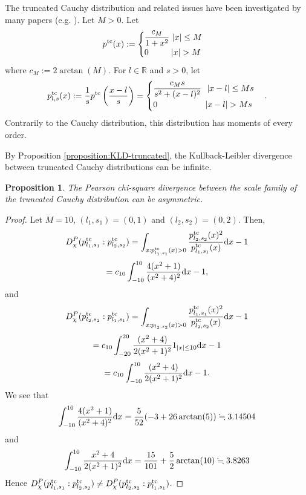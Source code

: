\documentclass[journal]{IEEEtran}
\newtheorem{proposition}[theorem]{Proposition}
\begin{document}
The truncated Cauchy distribution and related issues have been investigated by many papers (e.g. \cite{Nadarajah2004, Nadarajah2007,  Ateya2013, Aldahlan2020}). 
Let $M > 0$. 
Let 
\[ p^{\textup{tc}}(x) := \begin{cases} \dfrac{c_M}{1+x^2} \ |x| \le M \\ 0 \ \ \ \   \ \  \ \ |x| > M \end{cases} \]
where $c_M := 2 \arctan(M)$. 
For $l \in \mathbb{R}$ and $s > 0$, 
let 
\[ p^{\textup{tc}}_{l,s}(x) := \frac{1}{s} p^{\textup{tc}}\left(\frac{x-l}{s}\right) =  \begin{cases} \dfrac{c_M s}{s^2+(x-l)^2} \ \  |x-l| \le Ms \\ 0 \ \ \  \ \ \ \ \ \ \  \ \ \ \ \ \ \  |x-l| > Ms \end{cases}.  \]
Contrarily to the Cauchy distribution, this distribution has moments of every order.

By Proposition \ref{proposition:KLD-truncated},  the Kullback-Leibler divergence between truncated Cauchy distributions can be infinite. 


\begin{proposition}
The Pearson chi-square divergence between the scale family of the truncated Cauchy distribution can be asymmetric. 
\end{proposition}

\begin{proof}
Let $M = 10$,  $(l_1, s_1) = (0,1)$ and $(l_2, s_2) = (0,2)$. 
Then, 
\[ D_\chi^P(p^{\textup{tc}}_{l_1, s_1}:p^{\textup{tc}}_{l_2, s_2}) =\int_{x : p^{\textup{tc}}_{l_1, s_1}(x) > 0} \frac{p^{\textup{tc}}_{l_2, s_2}(x)^2}{p^{\textup{tc}}_{l_1, s_1}(x)}\mathrm{d}x  -1 \]
\[= c_{10} \int_{-10}^{10} \frac{4(x^2 + 1)}{(x^2 + 4)^2} \mathrm{d}x -1, \]
and 
\[ D_\chi^P(p^{\textup{tc}}_{l_2, s_2}:p^{\textup{tc}}_{l_1, s_1}) =\int_{x : p_{l_2, s_2}(x) > 0} \frac{p^{\textup{tc}}_{l_1, s_1}(x)^2}{p^{\textup{tc}}_{l_2, s_2}(x)}\mathrm{d}x  -1 
\]
\[= c_{10} \int_{-20}^{20} \frac{(x^2 + 4) }{2(x^2 + 1)^2} 1_{|x| \le 10} \mathrm{d}x -1 \]
\[= c_{10} \int_{-10}^{10} \frac{(x^2 + 4) }{2(x^2 + 1)^2}  \mathrm{d}x -1. \]
We see that 
\[ \int_{-10}^{10} \frac{4(x^2 + 1)}{(x^2 + 4)^2} \mathrm{d}x = \frac{5}{52} (-3 + 26 \arctan(5)) \fallingdotseq 3.14504 \]
and 
\[ \int_{-10}^{10} \frac{x^2 + 4}{2(x^2 + 1)^2} \mathrm{d}x = \frac{15}{101} + \frac{5}{2} \arctan(10) \fallingdotseq 3.8263\]
Hence $D_\chi^P(p^{\textup{tc}}_{l_1, s_1}:p^{\textup{tc}}_{l_2, s_2}) \ne D_\chi^P(p^{\textup{tc}}_{l_2, s_2}:p^{\textup{tc}}_{l_1, s_1})$. 
\end{proof}
\end{document}
